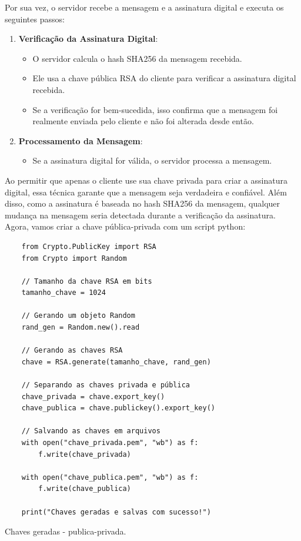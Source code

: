 \documentclass[a4paper,12pt]{article}
\begin{document}
Por sua vez, o servidor recebe a mensagem e a assinatura digital e executa 
os seguintes passos:

\begin{enumerate}
    \item \textbf{Verificação da Assinatura Digital}:
    \begin{itemize}
        \item O servidor calcula o hash SHA256 da mensagem recebida.
        \item Ele usa a chave pública RSA do cliente para verificar a assinatura digital recebida.
        \item Se a verificação for bem-sucedida, isso confirma que a mensagem foi realmente enviada 
        pelo cliente e não foi alterada desde então.
    \end{itemize}
    
    \item \textbf{Processamento da Mensagem}:
    \begin{itemize}
        \item Se a assinatura digital for válida, o servidor processa a mensagem.
    \end{itemize}
\end{enumerate}

Ao permitir que apenas o cliente use sua chave privada para criar a assinatura digital, essa técnica 
garante que a mensagem seja verdadeira e confiável. Além disso, como a assinatura é baseada no hash 
SHA256 da mensagem, qualquer mudança na mensagem seria detectada durante a verificação da assinatura. 
Agora, vamos criar a chave p\'ublica-privada com um script python:

\begin{listing}[!ht]
    \begin{verbatim}
    from Crypto.PublicKey import RSA
    from Crypto import Random

    // Tamanho da chave RSA em bits
    tamanho_chave = 1024

    // Gerando um objeto Random
    rand_gen = Random.new().read

    // Gerando as chaves RSA
    chave = RSA.generate(tamanho_chave, rand_gen)

    // Separando as chaves privada e pública
    chave_privada = chave.export_key()
    chave_publica = chave.publickey().export_key()

    // Salvando as chaves em arquivos
    with open("chave_privada.pem", "wb") as f:
        f.write(chave_privada)

    with open("chave_publica.pem", "wb") as f:
        f.write(chave_publica)

    print("Chaves geradas e salvas com sucesso!")
\end{verbatim}
\caption{Chaves geradas - publica-privada.}
\end{listing}
\end{document}
